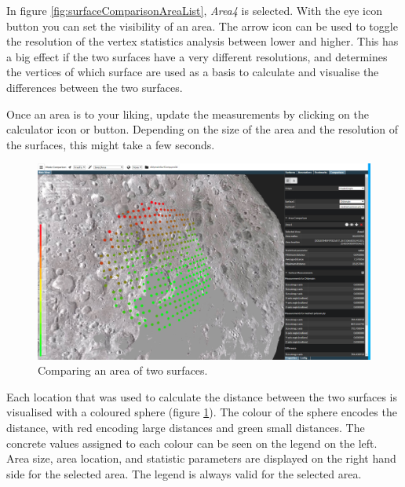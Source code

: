In figure \ref{fig:surfaceComparisonAreaList}, \emph{Area4} is selected. With the eye icon button you can set the visibility of an area. The arrow icon can be used to toggle the resolution of the vertex statistics analysis between lower and higher. This has a big effect if the two surfaces have a very different resolutions, and determines the vertices of which surface are used as a basis to calculate and visualise the differences between the two surfaces.

Once an area is to your liking, update the measurements by clicking on the calculator icon or button. Depending on the size of the area and the resolution of the surfaces, this might take a few seconds.

\begin{figure}[h]
	\centering
	\includegraphics[width=1.0\textwidth]{pics/surfaceComparisonArea3DView1.PNG}
	\caption[Comparing an area of two surfaces.]{Comparing an area of two surfaces.}
	\label{surfaceComparisonArea3DView1.PNG}
\end{figure}

Each location that was used to calculate the distance between the two surfaces is visualised with a coloured sphere (figure \ref{surfaceComparisonArea3DView1.PNG}). The colour of the sphere encodes the distance, with red encoding large distances and green small distances. The concrete values assigned to each colour can be seen on the legend on the left. Area size, area location, and statistic parameters are displayed on the right hand side for the selected area. The legend is always valid for the selected area.


